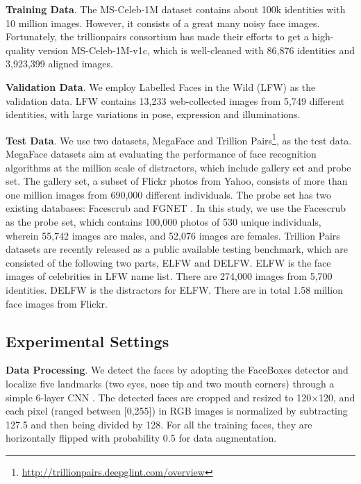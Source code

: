 \documentclass[10pt,twocolumn,letterpaper]{article}
\begin{document}
\noindent \textbf{Training Data}. The MS-Celeb-1M dataset \cite{Msceleb} contains about 100k identities with 10 million images. However, it consists of a great many noisy face images. Fortunately, the trillionpairs consortium has made their efforts to get a high-quality version MS-Celeb-1M-v1c, which is well-cleaned with 86,876 identities and 3,923,399 aligned images.



\noindent \textbf{Validation Data}. We employ Labelled Faces in the Wild (LFW) \cite{LFW} as the validation data. LFW contains 13,233 web-collected images from 5,749 different identities, with large variations in pose, expression and illuminations.




\noindent \textbf{Test Data}. We use two datasets, MegaFace \cite{megaface_1} and Trillion Pairs\footnote{\url{http://trillionpairs.deepglint.com/overview}}, as the test data. MegaFace datasets aim at evaluating the performance of face recognition algorithms at the million scale of distractors, which include gallery set and probe set. The gallery set, a subset of Flickr photos from Yahoo, consists of more than one million images from 690,000 different individuals. The probe set has two existing databases: Facescrub \cite{facescrub} and FGNET \cite{fgnet}. In this study, we use the Facescrub as the probe set, which contains 100,000 photos of 530 unique individuals, wherein 55,742 images are males, and 52,076 images are females. Trillion Pairs datasets are recently released as a public available testing benchmark, which are consisted of the following two parts, ELFW and DELFW. ELFW is the face images of celebrities in LFW name list. There are 274,000 images from 5,700 identities. DELFW is the distractors for ELFW. There are in total 1.58 million face images from Flickr.



\subsection{Experimental Settings}
\noindent \textbf{Data Processing}.
We detect the faces by adopting the FaceBoxes detector \cite{facebox} and localize five landmarks (two eyes, nose tip and two mouth corners) through a simple 6-layer CNN \cite{feng2017wing}. The detected faces are cropped and resized to 120$\times$120, and each pixel (ranged between [0,255]) in RGB images is normalized by subtracting 127.5 and then being divided by 128. For all the training faces, they are horizontally flipped with probability 0.5 for data augmentation.
\end{document}
